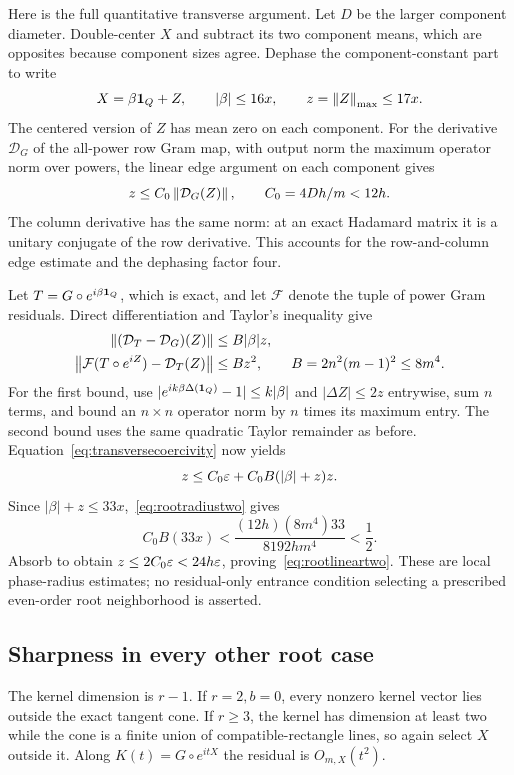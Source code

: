 Here is the full quantitative transverse argument. Let $D$ be the larger component diameter. Double-center $X$ and subtract its two component means, which are opposites because component sizes agree. Dephase the component-constant part to write
\[
 X=\beta\mathbf1_Q+Z,\qquad |\beta|\le16x,\qquad z=\left\lVert Z\right\rVert_{\mathrm{max}}\le17x.
\]
The centered version of $Z$ has mean zero on each component. For the derivative $\mathcal D_G$ of the all-power row Gram map, with output norm the maximum operator norm over powers, the linear edge argument on each component gives
\begin{equation}\label{eq:transversecoercivity}
 z\le C_0\left\lVert\mathcal D_G(Z)\right\rVert,\qquad C_0=4Dh/m<12h.
\end{equation}
The column derivative has the same norm: at an exact Hadamard matrix it is a unitary conjugate of the row derivative. This accounts for the row-and-column edge estimate and the dephasing factor four.

Let $T=G\circ e^{i\beta\mathbf1_Q}$, which is exact, and let $\mathcal F$ denote the tuple of power Gram residuals. Direct differentiation and Taylor's inequality give
\begin{align*}
 \left\lVert(\mathcal D_T-\mathcal D_G)(Z)\right\rVert&\le B|\beta|z,\\
 \left\lVert\mathcal F(T\circ e^{iZ})-\mathcal D_T(Z)\right\rVert&\le Bz^2,
 \qquad B=2n^2(m-1)^2\le8m^4.
\end{align*}
For the first bound, use $|e^{ik\beta\Delta(\mathbf1_Q)}-1|\le k|\beta|$ and $|\Delta Z|\le2z$ entrywise, sum $n$ terms, and bound an $n\times n$ operator norm by $n$ times its maximum entry. The second bound uses the same quadratic Taylor remainder as before. Equation~\eqref{eq:transversecoercivity} now yields
\[
 z\le C_0\varepsilon+C_0B(|\beta|+z)z.
\]
Since $|\beta|+z\le33x$,~\eqref{eq:rootradiustwo} gives
\[
 C_0B(33x)<\frac{(12h)(8m^4)33}{8192hm^4}<\frac12.
\]
Absorb to obtain $z\le2C_0\varepsilon<24h\varepsilon$, proving~\eqref{eq:rootlineartwo}. These are local phase-radius estimates; no residual-only entrance condition selecting a prescribed even-order root neighborhood is asserted.

\subsection{Sharpness in every other root case}
The kernel dimension is $r-1$. If $r=2,b=0$, every nonzero kernel vector lies outside the exact tangent cone. If $r\ge3$, the kernel has dimension at least two while the cone is a finite union of compatible-rectangle lines, so again select $X$ outside it. Along $K(t)=G\circ e^{itX}$ the residual is $O_{m,X}(t^2)$.

